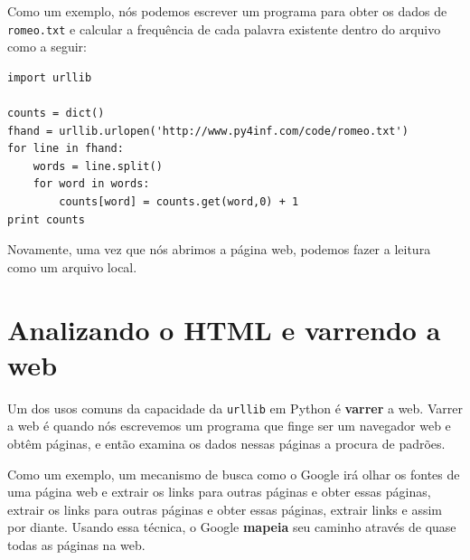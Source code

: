 Como um exemplo, nós podemos escrever 
um programa para obter os dados de
{\tt romeo.txt} e calcular a frequência
de cada palavra existente dentro do arquivo como a seguir:

\beforeverb
\begin{verbatim}
import urllib

counts = dict()
fhand = urllib.urlopen('http://www.py4inf.com/code/romeo.txt')
for line in fhand:
    words = line.split()
    for word in words:
        counts[word] = counts.get(word,0) + 1   
print counts
\end{verbatim}
\afterverb

Novamente, uma vez que nós abrimos a página web, 
podemos fazer a leitura como um arquivo local.

\section{Analizando o HTML e varrendo a web}

Um dos usos comuns da capacidade da {\tt urllib} em Python é 
{\bf varrer} a web. Varrer a web é quando nós escrevemos um programa
que finge ser um navegador web e obtêm páginas, e então examina os dados
nessas páginas a procura de padrões.

Como um exemplo, um mecanismo de busca como o Google irá olhar os fontes
de uma página web e extrair os links para outras páginas e obter
essas páginas, extrair os links para outras páginas e obter essas
páginas, extrair links e assim por diante. Usando essa técnica,
o Google {\bf mapeia} seu caminho através de quase todas as páginas
na web.   

